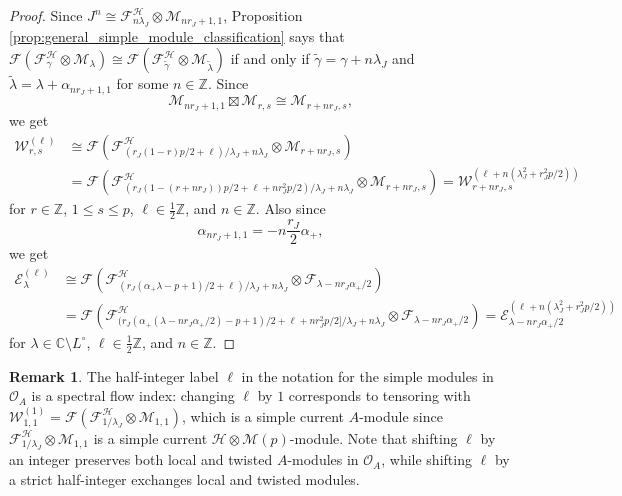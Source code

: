 \documentclass[11pt, reqno]{amsart}
\theoremstyle{definition}\newtheorem{defi}[thm]{Definition}
\theoremstyle{definition}\newtheorem{rem}[thm]{Remark}
\theoremstyle{definition}\newtheorem{exam}[thm]{Example}
\theoremstyle{definition}\newtheorem{assum}[thm]{Assumption}
\newcommand{\cE}{\mathcal{E}}
\newcommand{\cH}{\mathcal{H}}
\newcommand{\cM}{\mathcal{M}}
\newcommand{\cF}{\mathcal{F}}
\newcommand{\cO}{\mathcal{O}}
\newcommand{\cW}{\mathcal{W}}
\newcommand{\til}{\widetilde}
\newcommand{\CC}{\mathbb{C}}
\newcommand{\ZZ}{\mathbb{Z}}
\newcommand{\tens}{\boxtimes}
\begin{document}
\begin{proof}
Since $J^n\cong\cF^\cH_{n\lambda_J}\otimes\cM_{nr_J+1,1}$, Proposition \ref{prop:general_simple_module_classification} says that $\cF(\cF^\cH_\gamma\otimes\cM_\lambda)\cong\cF(\cF^\cH_{\til{\gamma}}\otimes\cM_{\til{\lambda}})$ if and only if $\til\gamma=\gamma+n\lambda_J$ and $\til{\lambda}=\lambda+\alpha_{nr_J+1,1}$ for some $n\in\ZZ$. Since 
\begin{equation}\label{eqn:Jn_times_Mrs}
\cM_{nr_J+1,1}\tens\cM_{r,s} \cong \cM_{r+nr_J,s},
\end{equation}
we get
\begin{align*}
\cW^{(\ell)}_{r,s} & \cong \cF\left(\cF^{\cH}_{(r_J(1-r)p/2+\ell)/\lambda_J+n\lambda_J}\otimes\cM_{r+nr_J,s}\right)\nonumber\\
& =\cF\left(\cF^\cH_{(r_J(1-(r+nr_J))p/2+\ell+nr_J^2p/2)/\lambda_J+n\lambda_J}\otimes\cM_{r+nr_J,s}\right) =\cW_{r+nr_J,s}^{(\ell+n(\lambda_J^2+r_J^2 p/2))}
\end{align*}
for $r\in\ZZ$, $1\leq s\leq p$, $\ell\in\frac{1}{2}\ZZ$, and $n\in\ZZ$. Also since
\begin{equation}\label{eqn:alpha_Jn}
\alpha_{nr_J+1,1}=-n\frac{r_J}{2}\alpha_+,
\end{equation}
we get
\begin{align*}
\cE^{(\ell)}_\lambda & \cong \cF\left(\cF^\cH_{(r_J(\alpha_+\lambda-p+1)/2+\ell)/\lambda_J+n\lambda_J}\otimes\cF_{\lambda-nr_J\alpha_+/2}\right)\nonumber\\
& = \cF\left(\cF^\cH_{(r_J(\alpha_+(\lambda-n r_J\alpha_+/2)-p+1)/2+\ell+n r_J^2 p/2]/\lambda_J+n\lambda_J}\otimes\cF_{\lambda-nr_J\alpha_+/2}\right) = \cE_{\lambda-nr_J\alpha_+/2}^{(\ell+n(\lambda_J^2+r_J^2 p/2))}
\end{align*}
for $\lambda\in\CC\setminus L^\circ$, $\ell\in\frac{1}{2}\ZZ$, and $n\in\ZZ$.
\end{proof}

\begin{rem}\label{rem:spectral_flow}
The half-integer label $\ell$ in the notation for the simple modules in $\cO_A$ is a spectral flow index: changing $\ell$ by $1$ corresponds to tensoring with $\cW^{(1)}_{1,1}=\cF(\cF^\cH_{1/\lambda_J}\otimes\cM_{1,1})$, which is a simple current $A$-module since $\cF^\cH_{1/\lambda_J}\otimes\cM_{1,1}$ is a simple current $\cH\otimes\cM(p)$-module. Note that shifting $\ell$ by an integer preserves both local and twisted $A$-modules in $\cO_A$, while shifting $\ell$ by a strict half-integer exchanges local and twisted modules.
\end{rem}
\end{document}
